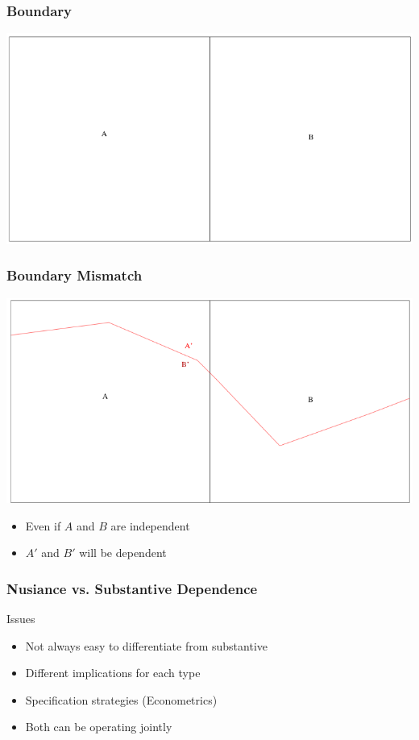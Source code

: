 \documentclass[nototal]{beamer}
\begin{document}
  \begin{frame}
    \frametitle{Boundary}
    \begin{center}
      \includegraphics[width=.65\linewidth]{boundary.png}
    \end{center}
  \end{frame}


  \begin{frame}
    \frametitle{Boundary Mismatch}
    \begin{center}
      \includegraphics[width=.65\linewidth]{boundary2.png}
    \end{center}

    \begin{itemize}
      \item Even if $A$ and $B$ are independent
      \item $A'$ and $B'$ will be dependent
    \end{itemize}
  \end{frame}

\begin{frame}
    \frametitle{Nusiance vs. Substantive Dependence}
    \begin{block}{Issues}
    \begin{itemize}
      \item Not always easy to differentiate from substantive
      \item Different implications for each type
      \item Specification strategies (Econometrics)
      \item Both can be operating jointly
    \end{itemize}
  \end{block}
  \end{frame}
\end{document}
